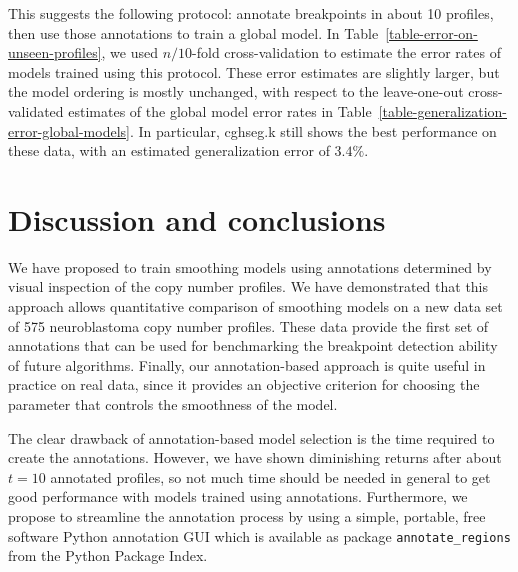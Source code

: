\documentclass{bioinfo}
\begin{document}
This suggests the following protocol: annotate breakpoints in about 10
profiles, then use those annotations to train a global model. In
Table~\ref{table-error-on-unseen-profiles}, we used $n/10$-fold
cross-validation to estimate the error rates of models trained using
this protocol. These error estimates are slightly larger, but the
model ordering is mostly unchanged, with respect to the leave-one-out
cross-validated estimates of the global model error rates in
Table~\ref{table-generalization-error-global-models}.  In particular,
cghseg.k still shows the best performance on these data, with an
estimated generalization error of $ 3.4\%$. 



\section{Discussion and conclusions}

We have proposed to train smoothing models using annotations
determined by visual inspection of the copy number profiles. We have
demonstrated that this approach allows quantitative comparison of
smoothing models on a new data set of 575 neuroblastoma copy number
profiles. These data provide the first set of annotations that can be
used for benchmarking the breakpoint detection ability of future
algorithms. Finally, our annotation-based approach is quite useful in
practice on real data, since it provides an objective criterion for
choosing the parameter that controls the smoothness of the model.

The clear drawback of annotation-based model selection is the time
required to create the annotations. 
However, 
we have shown diminishing returns
after about $t=10$ annotated profiles, so not much time should be
needed in general to get good performance with models trained using
annotations. Furthermore, we propose to streamline the annotation
process by using a simple, portable, free software Python annotation
GUI which is available as package \texttt{annotate\_regions} from the
Python Package Index.

\end{document}
